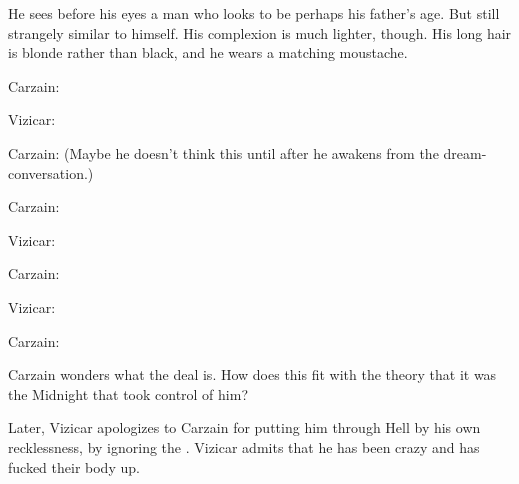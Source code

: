 He sees before his eyes a man who looks to be perhaps his father's age. 
But still strangely similar to himself. 
His complexion is much lighter, though. 
His long hair is blonde rather than black, and he wears a matching moustache. 

Carzain: 

Vizicar: 

Carzain: 
(Maybe he doesn't think this until after he awakens from the dream-conversation.)

Carzain: 

Vizicar: 

Carzain: 

Vizicar: 

Carzain: 

Carzain wonders what the deal is. 
How does this fit with the theory that it was the Midnight \Qliphoth{} that took control of him? 

Later, Vizicar apologizes to Carzain for putting him through Hell by his own recklessness, by ignoring the . 
Vizicar admits that he has been crazy and has fucked their body up. 









